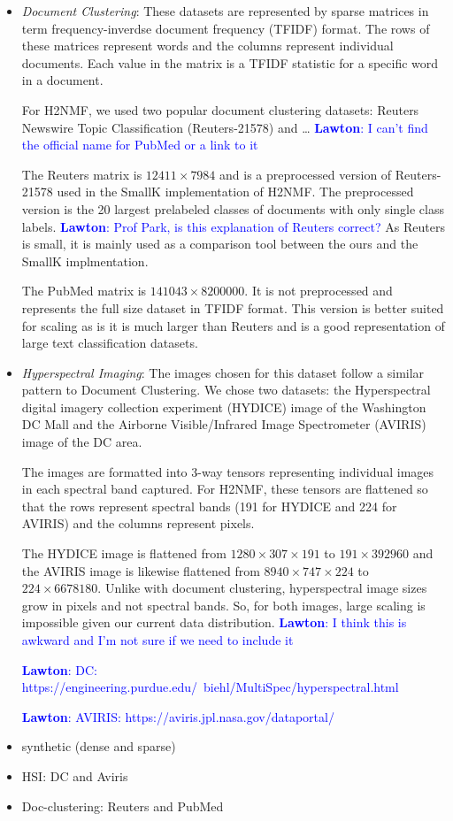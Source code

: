 \documentclass[conference,compsoc]{IEEEtran}
\newcommand{\LM}[1]{\textcolor{blue}{\textbf{Lawton}: #1}}
\begin{document}
\begin{itemize}
	\item \textit{Document Clustering}:
	These datasets are represented by sparse matrices in term frequency-inverdse document frequency (TFIDF) format.
	The rows of these matrices represent words and the columns represent individual documents. Each value in the matrix is a TFIDF statistic for
	a specific word in a document. 

	For H2NMF, we used two popular document clustering datasets: Reuters Newswire Topic Classification (Reuters-21578) and \dots
	\LM{I can't find the official name for PubMed or a link to it}

	The Reuters matrix is $12411\times 7984$ and is a preprocessed version of Reuters-21578 used in the SmallK implementation of H2NMF.
	The preprocessed version is the 20 largest prelabeled classes of documents with only single class labels. 
	\LM{Prof Park, is this explanation of Reuters correct?}
	As Reuters is small, it is mainly used as a comparison tool between the ours and the SmallK implmentation.

	The PubMed matrix is $141043\times 8200000$. It is not preprocessed and represents the full size dataset in TFIDF format. This version is
	better suited for scaling as is it is much larger than Reuters and is a good representation of large text classification datasets.

	\item \textit{Hyperspectral Imaging}:
	The images chosen for this dataset follow a similar pattern to Document Clustering. We chose two datasets: the Hyperspectral digital imagery
	collection experiment (HYDICE) image of the Washington DC Mall and the Airborne Visible/Infrared Image Spectrometer (AVIRIS) image 
	of the DC area. 

	The images are formatted into 3-way tensors representing individual images in each spectral band captured. For H2NMF, these tensors 
	are flattened so that the rows represent spectral bands (191 for HYDICE and 224 for AVIRIS) and the columns represent pixels.

	The HYDICE image is flattened from $1280\times 307\times 191$ to $191\times 392960$ and the AVIRIS image is likewise
	flattened from $8940\times 747\times 224$ to $224\times 6678180$. Unlike with document clustering, hyperspectral image sizes grow in pixels
	and not spectral bands. So, for both images, large scaling is impossible given our current data distribution.
	\LM{I think this is awkward and I'm not sure if we need to include it}
	

	\LM{DC: https://engineering.purdue.edu/~biehl/MultiSpec/hyperspectral.html}

	\LM{AVIRIS: https://aviris.jpl.nasa.gov/dataportal/}

	

	\item synthetic (dense and sparse)
	\item HSI: DC and Aviris
	\item Doc-clustering: Reuters and PubMed
\end{itemize}
\end{document}
